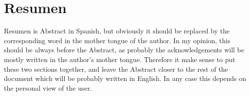 \chapter*{Resumen} 
Resumen is Abstract in Spanish, but obviously it should be replaced by the corresponding word in the mother tongue of the author. In my opinion, this should be always before the Abstract, as probably the acknowledgements will be mostly written in the author's mother tongue. Therefore it make sense to put these two sections together, and leave the Abstract closer to the rest of the document which will be probably written in English. In any case this depends on the personal view of the user.